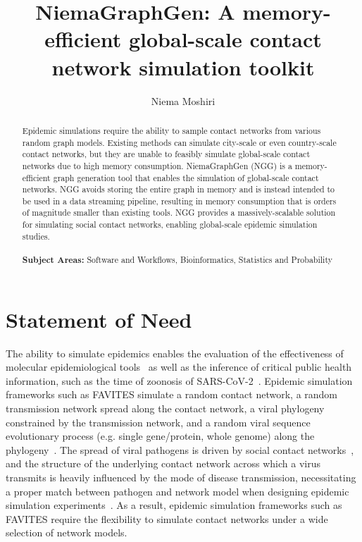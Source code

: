 \documentclass[a4paper,num-refs,gigabyte]{oup-contemporary}
\title{NiemaGraphGen: A memory-efficient global-scale contact network simulation toolkit}
\author[1,\authfn{1}]{Niema Moshiri}
\affil[1]{Department of Computer Science \& Engineering, UC San Diego, La Jolla, 92093, USA}
\begin{document}
\begin{frontmatter}
\maketitle
\begin{abstract}
Epidemic simulations require the ability to sample contact networks from various random graph models. Existing methods can simulate city-scale or even country-scale contact networks, but they are unable to feasibly simulate global-scale contact networks due to high memory consumption. NiemaGraphGen (NGG) is a memory-efficient graph generation tool that enables the simulation of global-scale contact networks. NGG avoids storing the entire graph in memory and is instead intended to be used in a data streaming pipeline, resulting in memory consumption that is orders of magnitude smaller than existing tools. NGG provides a massively-scalable solution for simulating social contact networks, enabling global-scale epidemic simulation studies.\\
~\\
\textbf{Subject Areas:} Software and Workflows, Bioinformatics, Statistics and Probability
\end{abstract}
\end{frontmatter}

\section{Statement of Need}

The ability to simulate epidemics enables the evaluation of the effectiveness of molecular epidemiological tools~\cite{Moshiri2021} as well as the inference of critical public health information, such as the time of zoonosis of SARS-CoV-2~\cite{Pekar2021}.
Epidemic simulation frameworks such as FAVITES simulate a random contact network, a random transmission network spread along the contact network, a viral phylogeny constrained by the transmission network, and a random viral sequence evolutionary process (e.g. single gene/protein, whole genome) along the phylogeny~\cite{Moshiri2018}.
The spread of viral pathogens is driven by social contact networks~\cite{Kelly1991}, and the structure of the underlying contact network across which a virus transmits is heavily influenced by the mode of disease transmission, necessitating a proper match between pathogen and network model when designing epidemic simulation experiments~\cite{Craft2015}. As a result, epidemic simulation frameworks such as FAVITES require the flexibility to simulate contact networks under a wide selection of network models.
\end{document}

